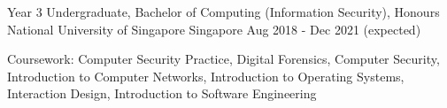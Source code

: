 

\begin{cventries}

  \cventry
  {Year 3 Undergraduate, Bachelor of Computing (Information Security), Honours} %
  {National University of Singapore} %
  {Singapore} %
  {Aug 2018 - Dec 2021 (expected)} %
  {
    \begin{cvitems} %
      \item {Coursework: Computer Security Practice, Digital Forensics, Computer Security, Introduction to Computer Networks, Introduction to Operating Systems, Interaction Design, Introduction to Software Engineering}
    \end{cvitems}
  }

\end{cventries}
